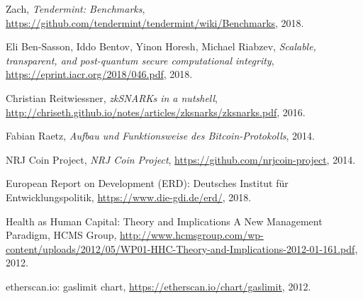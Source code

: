 \begin{thebibliography}{9}
  Zach,
  \textit{Tendermint: Benchmarks},
  \url{https://github.com/tendermint/tendermint/wiki/Benchmarks},
  2018.
  
  Eli Ben-Sasson, Iddo Bentov, Yinon Horesh, Michael Riabzev,
  \textit{Scalable, transparent, and post-quantum secure computational
integrity},
  \url{https://eprint.iacr.org/2018/046.pdf},
  2018.
  
  Christian Reitwiessner,
  \textit{zkSNARKs in a nutshell},
  \url{http://chriseth.github.io/notes/articles/zksnarks/zksnarks.pdf},
  2016.

  Fabian Raetz,
  \textit{Aufbau und Funktionsweise des Bitcoin-Protokolls},
  2014.  

  NRJ Coin Project,
  \textit{NRJ Coin Project},
  \url{https://github.com/nrjcoin-project},
  2014.

  European Report on Development (ERD): Deutsches Institut für Entwicklungspolitik,
  \url{https://www.die-gdi.de/erd/},
  2018.
  
  Health as Human Capital: Theory and Implications A New Management Paradigm, HCMS Group,
  \url{http://www.hcmsgroup.com/wp-content/uploads/2012/05/WP01-HHC-Theory-and-Implications-2012-01-161.pdf},
  2012.
 
  etherscan.io: gaslimit chart,
  \url{https://etherscan.io/chart/gaslimit},
  2012. 

\end{thebibliography}

